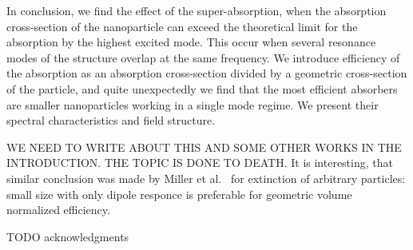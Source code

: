 \documentclass[aps,prl,twocolumn,showpacs,superscriptaddress,groupedaddress]{revtex4-1}
\begin{document}
In conclusion, we find the effect of the super-absorption, when the
absorption cross-section of the nanoparticle can exceed the
theoretical limit for the absorption by the highest excited mode. This
occur when several resonance modes of the structure overlap at the
same frequency. We introduce efficiency of the absorption as an
absorption cross-section divided by a geometric cross-section of the
particle, and quite unexpectedly we find that the most efficient
absorbers are smaller nanoparticles working in a single mode
regime. We present their spectral characteristics and field structure.

WE NEED TO WRITE ABOUT THIS AND SOME OTHER WORKS IN THE
INTRODUCTION. THE TOPIC IS DONE TO DEATH. 
It is interesting, that similar conclusion was made by Miller et
al.~\cite{Miller-2014} for extinction of arbitrary particles: small
size with only dipole responce is preferable for geometric volume
normalized efficiency.


\begin{acknowledgments}

  TODO acknowledgments
\end{acknowledgments}


\end{document}
